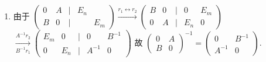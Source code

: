 	 \paragraph{} %
		 \begin{enumerate}
			 \item %
			       由于 $\begin{pmatrix}
					       0 & A & | & E_n       \\
					       B & 0 & | &     & E_m
				       \end{pmatrix} \xrightarrow{r_1 \leftrightarrow r_2} \begin{pmatrix}
					       B & 0 & | & 0   & E_m \\
					       0 & A & | & E_n & 0
				       \end{pmatrix}$
			       $\xrightarrow[B^{-1}r_1]{A^{-1}r_2} \begin{pmatrix}
					       E_m & 0   & | & 0      & B^{-1} \\
					       0   & E_n & | & A^{-1} & 0
				       \end{pmatrix}$
			       故 $\begin{pmatrix}
					       0 & A \\
					       B & 0
				       \end{pmatrix}^{-1} = \begin{pmatrix}
					       0      & B^{-1} \\
					       A^{-1} & 0
				       \end{pmatrix}$.


\end{enumerate}
